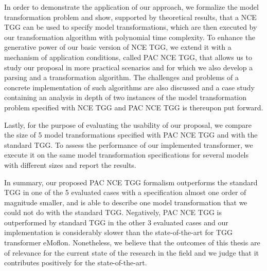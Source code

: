 In order to demonstrate the application of our approach, we formalize the model transformation problem and show, supported by theoretical results, that a NCE TGG can be used to specify model transformations, which are then executed by our transformation algorithm with polynomial time complexity. To enhance the generative power of our basic version of NCE TGG, we extend it with a mechanism of application conditions, called PAC NCE TGG, that allows us to study our proposal in more practical scenarios and for which we also develop a parsing and a transformation algorithm. The challenges and problems of a concrete implementation of such algorithms are also discussed and a case study containing an analysis in depth of two instances of the model transformation problem specified with NCE TGG and PAC NCE TGG is thereupon put forward.

Lastly, for the purpose of evaluating the usability of our proposal, we compare the size of 5 model transformations specified with PAC NCE TGG and with the standard TGG. To assess the performance of our implemented transformer, we execute it on the same model transformation specifications for several models with different sizes and report the results.

In summary, our proposed PAC NCE TGG formalism outperforms the standard TGG in one of the 5 evaluated cases with a specification almost one order of magnitude smaller, and is able to describe one model transformation that we could not do with the standard TGG. Negatively, PAC NCE TGG is outperformed by standard TGG in the other 3 evaluated cases and our implementation is considerably slower than the state-of-the-art for TGG transformer eMoflon. Nonetheless, we believe that the outcomes of this thesis are of relevance for the current state of the research in the field and we judge that it contributes positively for the state-of-the-art.

